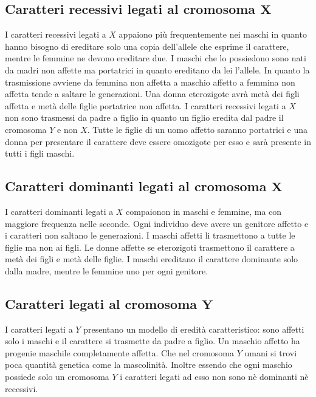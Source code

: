 \subsection{Caratteri recessivi legati al cromosoma $\mathbf{X}$}
I caratteri recessivi legati a $X$ appaiono pi\`u frequentemente nei maschi in quanto hanno bisogno di ereditare solo una copia dell'allele che esprime il carattere, mentre le femmine ne devono ereditare due.
I maschi che lo possiedono sono nati da madri non affette ma portatrici in quanto ereditano da lei l'allele.
In quanto la trasmissione avviene da femmina non affetta a maschio affetto a femmina non affetta tende a saltare le generazioni. 
Una donna eterozigote avr\`a met\`a dei figli affetta e met\`a delle figlie portatrice non affetta. 
I caratteri recessivi legati a $X$ non sono trasmessi da padre a figlio in quanto un figlio eredita dal padre il cromosoma $Y$ e non $X$.
Tutte le figlie di un uomo affetto saranno portatrici e una donna per presentare il carattere deve essere omozigote per esso e sar\`a presente in tutti i figli maschi. 

\subsection{Caratteri dominanti legati al cromosoma $\mathbf{X}$}
I caratteri dominanti legati a $X$ compaionon in maschi e femmine, ma con maggiore frequenza nelle seconde. 
Ogni individuo deve avere un genitore affetto e i caratteri non saltano le generazioni.
I maschi affetti li trasmettono a tutte le figlie ma non ai figli. 
Le donne affette se eterozigoti trasmettono il carattere a met\`a dei figli e met\`a delle figlie. 
I maschi ereditano il carattere dominante solo dalla madre, mentre le femmine uno per ogni genitore. 

\subsection{Caratteri legati al cromosoma $\mathbf{Y}$}
I caratteri legati a $Y$ presentano un modello di eredit\`a caratteristico: sono affetti solo i maschi e il carattere si trasmette da padre a figlio.
Un maschio affetto ha progenie maschile completamente affetta. 
Che nel cromosoma $Y$ umani si trovi poca quantit\`a genetica come la mascolinit\`a.
Inoltre essendo che ogni maschio possiede solo un cromosoma $Y$ i caratteri legati ad esso non sono n\`e dominanti n\`e recessivi.


